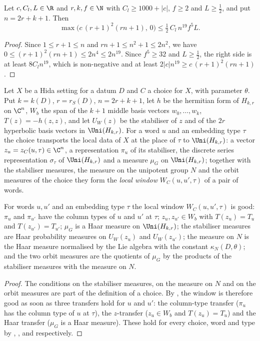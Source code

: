 \begin{lemma}\label{pf:thmS:acle}
Let $c,C_l,L\in\R$ and $r,k,f\in\N$ with $C_l\ge1000+|c|$, $f\ge2$ and $L\ge\frac12$, and put $n=2r+k+1$. Then
\[
\max\bigl(c\,(r+1)^2(rn+1),\,0\bigr)\le\tfrac12\,C_l\,n^{19}f^5L.
\]
\end{lemma}

\begin{proof}
Since $1\le r+1\le n$ and $rn+1\le n^2+1\le2n^2$, we have $0\le(r+1)^2(rn+1)\le2n^4\le2n^{19}$. Since $f^5\ge32$ and
$L\ge\frac12$, the right side is at least $8C_ln^{19}$, which is non-negative and at least $2|c|n^{19}\ge c\,(r+1)^2(rn+1)$.
\end{proof}

Let $X$ be a Hida setting for a datum $D$ and $C$ a choice for $X$, with parameter $\theta$. Put $k=k(D)$, $r=r_S(D)$,
$n=2r+k+1$, let $h$ be the hermitian form of $H_{k,r}$ on $\C^n$, $W_b$ the span of the $k+1$ middle basis vectors
$w_0,\dots,w_k$, $T(z)=-h(z,z)$, and let $U_W(z)$ be the stabiliser of $z$ and of the $2r$ hyperbolic basis vectors in
$\Uni(H_{k,r})$. For a word $u$ and an embedding type $\tau$ the choice transports the local data of $X$ at the place of
$\tau$ to $\Uni(H_{k,r})$: a vector $z_u=z_C(u,\tau)\in\C^n$, a representation $\pi_u$ of its stabiliser, the discrete series
representation $\sigma_\tau$ of $\Uni(H_{k,r})$ and a measure $\mu_G$ on $\Uni(H_{k,r})$; together with the stabiliser measures,
the measure on the unipotent group $N$ and the orbit measures of the choice they form the \emph{local window}
$W_C(u,u',\tau)$ of a pair of words.

\begin{lemma}\label{pf:thmS:goodw}
For words $u,u'$ and an embedding type $\tau$ the local window $W_C(u,u',\tau)$ is good: $\pi_u$ and $\pi_{u'}$ have the column
types of $u$ and $u'$ at $\tau$; $z_u,z_{u'}\in W_b$ with $T(z_u)=T_u$ and $T(z_{u'})=T_{u'}$; $\mu_G$ is a Haar measure on
$\Uni(H_{k,r})$; the stabiliser measures are Haar probability measures on $U_W(z_u)$ and $U_W(z_{u'})$; the measure on $N$ is
the Haar measure normalised by the Lie algebra with the constant $\kappa_N(D,\theta)$; and the two orbit measures are the
quotients of $\mu_G$ by the products of the stabiliser measures with the measure on $N$.
\end{lemma}

\begin{proof}
The conditions on the stabiliser measures, on the measure on $N$ and on the orbit measures are part of the definition of a
choice. By , the window is therefore good as soon as three transfers hold for $u$ and
$u'$: the column-type transfer ($\pi_u$ has the column type of $u$ at $\tau$), the $z$-transfer ($z_u\in W_b$ and $T(z_u)=T_u$)
and the Haar transfer ($\mu_G$ is a Haar measure). These hold for every choice, word and type by
, , and  respectively.
\end{proof}

